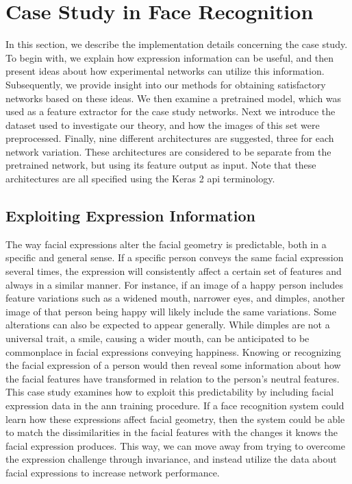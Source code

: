 \section{Case Study in Face Recognition}

In this section, we describe the implementation details concerning the case study. To begin with, we explain how expression information can be useful, and then present ideas about how experimental networks can utilize this information. Subsequently, we provide insight into our methods for obtaining satisfactory networks based on these ideas. We then examine a pretrained model, which was used as a feature extractor for the case study networks. Next we introduce the dataset used to investigate our theory, and how the images of this set were preprocessed. Finally, nine different architectures are suggested, three for each network variation. These architectures are considered to be separate from the pretrained network, but using its feature output as input. Note that these architectures are all specified using the Keras 2 \acrshort{api} terminology.

\subsection{Exploiting Expression Information}

The way facial expressions alter the facial geometry is predictable, both in a specific and general sense. If a specific person conveys the same facial expression several times, the expression will consistently affect a certain set of features and always in a similar manner. For instance, if an image of a happy person includes feature variations such as a widened mouth, narrower eyes, and dimples, another image of that person being happy will likely include the same variations. Some alterations can also be expected to appear generally. While dimples are not a universal trait, a smile, causing a wider mouth, can be anticipated to be commonplace in facial expressions conveying happiness. Knowing or recognizing the facial expression of a person would then reveal some information about how the facial features have transformed in relation to the person's neutral features. This case study examines how to exploit this predictability by including facial expression data in the \acrshort{ann} training procedure. If a face recognition system could learn how these expressions affect facial geometry, then the system could be able to match the dissimilarities in the facial features with the changes it knows the facial expression produces. This way, we can move away from trying to overcome the expression challenge through invariance, and instead utilize the data about facial expressions to increase network performance.

